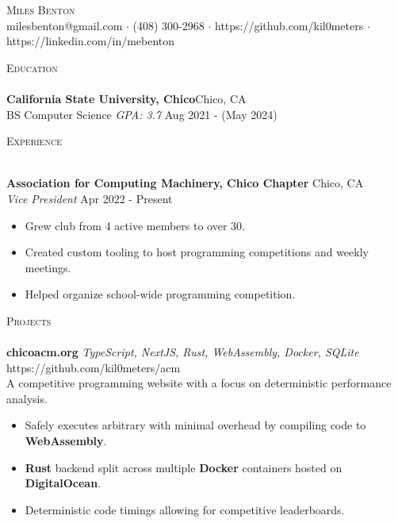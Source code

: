\documentclass[letterpaper]{article}
\newcommand{\lineunder} {
    \vspace*{-8pt} \\
    \hspace*{-18pt} \hrulefill \\
}
\newcommand{\header} [1] {
    {\hspace*{-18pt}\vspace*{6pt} \textsc{#1}}
    \vspace*{-6pt} \lineunder
}
\begin{document}
\vspace*{-40pt}



\vspace*{-10pt}
\begin{center}
	{\Huge \scshape {Miles Benton}}\\
	milesbenton@gmail.com $\cdot$ (408) 300-2968 $\cdot$ https://github.com/kil0meters $\cdot$ https://linkedin.com/in/mebenton\\
\end{center}

\header{Education}
\textbf{California State University, Chico}\hfill Chico, CA\\
BS Computer Science \textit{GPA: 3.7} \hfill Aug 2021 - (May 2024)\\
\vspace{2mm}

\header{Experience}
\vspace{1mm}

\textbf{Association for Computing Machinery, Chico Chapter} \hfill Chico, CA\\
\textit{Vice President} \hfill Apr 2022 - Present\\
\vspace{-1mm}
\begin{itemize} \itemsep 1pt
	\item Grew club from 4 active members to over 30.
	\item Created custom tooling to host programming competitions and weekly meetings.
  \item Helped organize school-wide programming competition.
\end{itemize}

\header{Projects}
{\textbf{chicoacm.org}} {\sl TypeScript, NextJS, Rust, WebAssembly, Docker, SQLite} \hfill https://github.com/kil0meters/acm\\
A competitive programming website with a focus on deterministic performance analysis.\\
    \begin{itemize}
      \item Safely executes arbitrary with minimal overhead by compiling code to \textbf{WebAssembly}.
      \item \textbf{Rust} backend split across multiple \textbf{Docker} containers hosted on \textbf{DigitalOcean}.
      \item Deterministic code timings allowing for competitive leaderboards.
    \end{itemize}
\end{document}
